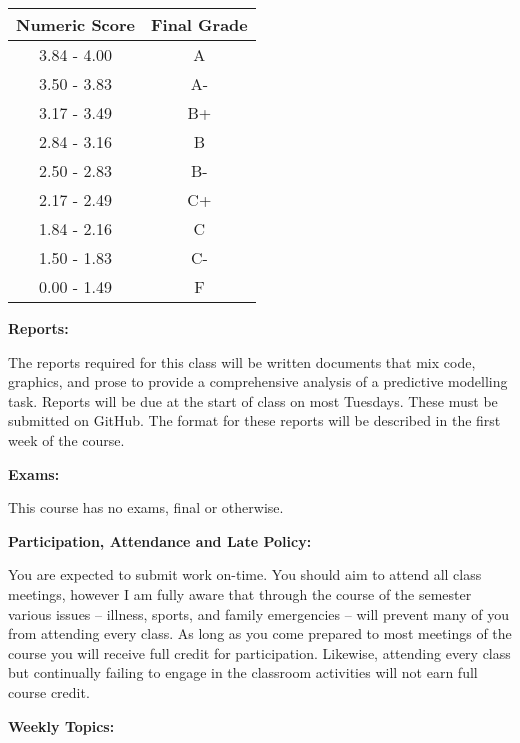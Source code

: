 \documentclass[12pt]{article}
\begin{document}
\begin{center}
\begin{tabular}{c || c}
Numeric Score & Final Grade \\
\hline \hline
3.84 - 4.00 & A  \\
3.50 - 3.83 & A- \\
3.17 - 3.49 & B+ \\
2.84 - 3.16 & B  \\
2.50 - 2.83 & B- \\
2.17 - 2.49 & C+ \\
1.84 - 2.16 & C  \\
1.50 - 1.83 & C- \\
0.00 - 1.49 & F
\end{tabular}
\end{center}

\vspace{0.4cm}

\textbf{Reports:} \vspace{6pt}

The reports required for this class will be written documents that
mix code, graphics, and prose to provide a comprehensive analysis of
a predictive modelling task. Reports will be due at the start of class
on most Tuesdays. These must be submitted on GitHub. The format for
these reports will be described in the first week of the course.

\vspace{0.4cm}

\textbf{Exams:} \vspace{6pt}

This course has no exams, final or otherwise.

\vspace{0.4cm}

\textbf{Participation, Attendance and Late Policy:} \vspace{6pt}

You are expected to submit work on-time.
You should aim to attend all class meetings, however I am fully aware that through
the course of the semester various issues -- illness, sports, and family emergencies --
will prevent many of you from attending every class. As long as you come
prepared to most meetings of the course you will receive full credit for participation.
Likewise, attending every class but continually failing to engage in
the classroom activities will not earn full course credit.

\newpage

\textbf{Weekly Topics:} \vspace{6pt}
\end{document}
